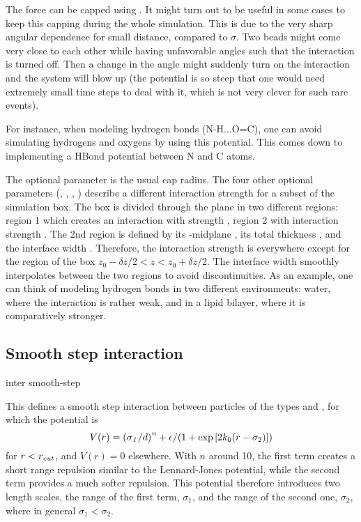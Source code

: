 The force can be capped using . It might turn out
to be useful in some cases to keep this capping during the whole
simulation. This is due to the very sharp angular dependence for small
distance, compared to $\sigma$. Two beads might come very close to each other
while having unfavorable angles such that the interaction is turned off. Then
a change in the angle might suddenly turn on the interaction and the system
will blow up (the potential is so steep that one would need extremely small
time steps to deal with it, which is not very clever for such rare events).

For instance, when modeling hydrogen bonds (N-H...O=C), one can avoid
simulating hydrogens and oxygens by using this potential. This comes down to
implementing a HBond potential between N and C atoms.

The optional parameter  is the usual cap radius. The four
other optional parameters (, , \var{\kappa},
) describe a different interaction strength  for
a subset of the simulation box. The box is divided through the  plane
in two different regions: region 1 which creates an interaction with strength
\var{\epsilon}, region 2 with interaction strength . The 2nd
region is defined by its -midplane , its total thickness
, and the interface width \var{\kappa}. Therefore, the
interaction strength is \var{\epsilon} everywhere except for the region of the
box $z_0-\delta z/2<z<z_0+\delta z/2$. The interface width smoothly
interpolates between the two regions to avoid discontinuities. As an example,
one can think of modeling hydrogen bonds in two different environments: water,
where the interaction is rather weak, and in a lipid bilayer, where it is
comparatively stronger.

\subsection{Smooth step interaction}
\begin{essyntax}
  inter  
  smooth-step   \var{\epsilon} 
   
  \begin{features}
  \end{features}
\end{essyntax}
This defines a smooth step interaction between particles of the
types  and , for which the potential is
\begin{equation}
  V(r)= \left(\mathrm{\mathit{\sigma_1}}/d\right)^{\mathrm{\mathit{n}}} + \epsilon/(1 + \exp\left[2k_0 (r - \sigma_2)\right])
\end{equation}
for $r<r_\mathrm{\mathrm{\mathit{cut}}}$, and $V(r)=0$ elsewhere. With $n$ around
10, the first term creates a short range repulsion similar to the
Lennard-Jones potential, while the second term provides a much softer
repulsion. This potential therefore introduces two length scales, the
range of the first term, $\sigma_1$, and the range of the second one,
$\sigma_2$, where in general $\sigma_1<\sigma_2$.

